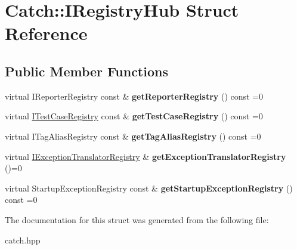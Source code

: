 \hypertarget{structCatch_1_1IRegistryHub}{}\section{Catch\+:\+:I\+Registry\+Hub Struct Reference}
\label{structCatch_1_1IRegistryHub}
\subsection*{Public Member Functions}
\begin{DoxyCompactItemize}
\item 
virtual I\+Reporter\+Registry const \& {\bfseries get\+Reporter\+Registry} () const =0\hypertarget{structCatch_1_1IRegistryHub_a55534563f7ecf7e20ec1e37285ebe54d}{}\label{structCatch_1_1IRegistryHub_a55534563f7ecf7e20ec1e37285ebe54d}

\item 
virtual \hyperlink{structCatch_1_1ITestCaseRegistry}{I\+Test\+Case\+Registry} const \& {\bfseries get\+Test\+Case\+Registry} () const =0\hypertarget{structCatch_1_1IRegistryHub_af4f6255f0c0f8f1f179fa9d7d4843076}{}\label{structCatch_1_1IRegistryHub_af4f6255f0c0f8f1f179fa9d7d4843076}

\item 
virtual I\+Tag\+Alias\+Registry const \& {\bfseries get\+Tag\+Alias\+Registry} () const =0\hypertarget{structCatch_1_1IRegistryHub_a3c511b1d33e5a6d95c333a0ff387df1a}{}\label{structCatch_1_1IRegistryHub_a3c511b1d33e5a6d95c333a0ff387df1a}

\item 
virtual \hyperlink{structCatch_1_1IExceptionTranslatorRegistry}{I\+Exception\+Translator\+Registry} \& {\bfseries get\+Exception\+Translator\+Registry} ()=0\hypertarget{structCatch_1_1IRegistryHub_a3606988da110c016c5af3ae63454eb78}{}\label{structCatch_1_1IRegistryHub_a3606988da110c016c5af3ae63454eb78}

\item 
virtual Startup\+Exception\+Registry const \& {\bfseries get\+Startup\+Exception\+Registry} () const =0\hypertarget{structCatch_1_1IRegistryHub_a00281210628e6c616aca1d3e0d84db04}{}\label{structCatch_1_1IRegistryHub_a00281210628e6c616aca1d3e0d84db04}

\end{DoxyCompactItemize}


The documentation for this struct was generated from the following file\+:\begin{DoxyCompactItemize}
\item 
catch.\+hpp\end{DoxyCompactItemize}
